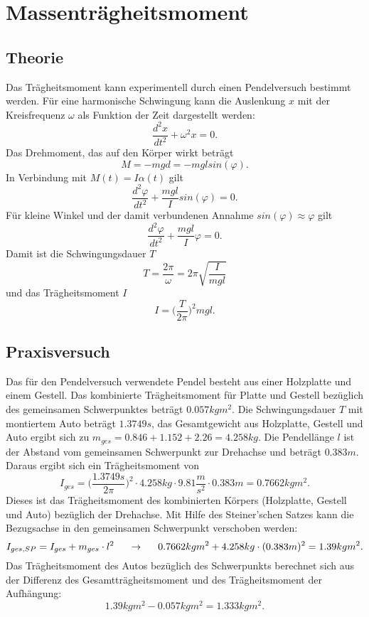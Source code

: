 \section{Massenträgheitsmoment}
\subsection{Theorie}
Das Trägheitsmoment kann experimentell durch einen Pendelversuch bestimmt werden. 
Für eine harmonische Schwingung kann die Auslenkung $x$ mit der Kreisfrequenz $\omega$ als Funktion der Zeit dargestellt werden:
\[ \frac{d^2x}{dt^2}+\omega^2x=0.\]
Das Drehmoment, das auf den Körper wirkt beträgt 
\[M=-mgd = -mglsin(\varphi).\]
In Verbindung mit \(M(t) = I\alpha(t)\) gilt \[ \frac{d^2\varphi}{dt^2}+\frac{mgl}{I}sin(\varphi)=0.\]
Für kleine Winkel und der damit verbundenen Annahme \(sin(\varphi)\approx \varphi\) gilt \[\frac{d^2\varphi}{dt^2}+\frac{mgl}{I} \varphi =0.\]
Damit ist  die Schwingungsdauer $T$  
\[T=\frac{2\pi}{\omega} = 2\pi \sqrt{\frac{I}{mgl}}\] 
und das Trägheitsmoment $I$ 
\[I=\Big(\frac{T}{2\pi}\Big)^2mgl.\]

\subsection{Praxisversuch}
Das für den Pendelversuch verwendete Pendel besteht aus einer Holzplatte und einem Gestell. Das kombinierte Trägheitsmoment für Platte und Gestell bezüglich des gemeinsamen Schwerpunktes beträgt $0.057 kg m^2.$
Die Schwingungsdauer $T$ mit montiertem Auto beträgt $1.3749s$, das Gesamtgewicht aus Holzplatte, Gestell und Auto ergibt sich zu $m_{ges}=0.846+1.152+2.26 = 4.258kg$. Die Pendellänge $l$ ist der Abstand  vom gemeinsamen Schwerpunkt zur Drehachse und beträgt  $0.383m.$   Daraus  ergibt sich ein Trägheitsmoment von 
\[I_{ges} = \Big(\frac{1.3749 s}{2\pi}\Big)^2 \cdot 4.258 kg \cdot 9.81\frac{m}{s^2} \cdot 0.383m = 0.7662 kg m^2.\]
Dieses ist das Trägheitsmoment  des kombinierten Körpers (Holzplatte, Gestell und Auto) bezüglich der Drehachse. Mit Hilfe des Steiner'schen Satzes kann die Bezugsachse in den gemeinsamen Schwerpunkt verschoben werden: 
\[I_{ges,SP} = I_{ges} + m_{ges} \cdot l^2  \hspace{5mm} \rightarrow  \hspace{5mm} 0.7662 kg m^2+ 4.258 kg \cdot (0.383m)^2 = 1.39kgm^2.\] 
Das Trägheitsmoment des Autos bezüglich des Schwerpunkts berechnet sich aus der Differenz des Gesamtträgheitsmoment und des Trägheitsmoment der Aufhängung:
\[1.39kgm^2-0.057kgm^2 = 1.333 kgm^2.\]
